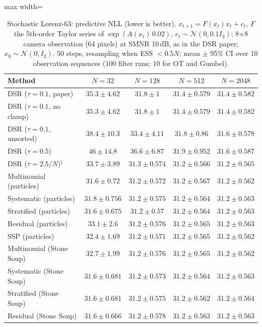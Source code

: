 \begin{table}[H]
\centering
\small
\caption{Stochastic Lorenz-63: predictive NLL (lower is better). $x_{t+1}=F(x_t)x_t+e_t$, $F$ the 5th-order Taylor series of $\exp(A(x_t)\,0.02)$, $e_t\sim\mathcal N(0,0.1I_3)$; 8$\times$8 camera observation (64 pixels) at SMNR 10\,dB, as in the DSR paper; $x_0\sim\mathcal N(0,I_3)$. 50 steps, resampling when ESS $<0.5N$; mean $\pm$ 95\% CI over 10 observation sequences (100 filter runs; 10 for OT and Gumbel).}
\label{tab:lorenz63-predictive_nll}
\begin{adjustbox}{max width=\linewidth}
\begin{tabular}{lcccc}
\toprule
Method & $N{=}32$ & $N{=}128$ & $N{=}512$ & $N{=}2048$ \\
\midrule
DSR ($\tau{=}0.1$, paper) & $35.3\pm4.62$ & $31.8\pm1$ & $31.4\pm0.579$ & $31.4\pm0.582$ \\
DSR ($\tau{=}0.1$, no clamp) & $35.3\pm4.62$ & $31.8\pm1$ & $31.4\pm0.579$ & $31.4\pm0.582$ \\
DSR ($\tau{=}0.1$, unsorted) & $38.4\pm10.3$ & $33.4\pm4.11$ & $31.8\pm0.86$ & $31.6\pm0.578$ \\
DSR ($\tau{=}0.5$) & $46\pm14.8$ & $36.6\pm6.87$ & $31.9\pm0.952$ & $31.6\pm0.587$ \\
DSR ($\tau{=}2.5/N$)$^\dagger$ & $33.7\pm3.89$ & $31.3\pm0.574$ & $31.2\pm0.566$ & $31.2\pm0.565$ \\
\midrule
Multinomial (particles) & $31.6\pm0.72$ & $31.2\pm0.572$ & $31.2\pm0.567$ & $31.2\pm0.562$ \\
Systematic (particles) & $31.8\pm0.756$ & $31.2\pm0.575$ & $31.2\pm0.564$ & $31.2\pm0.563$ \\
Stratified (particles) & $31.6\pm0.675$ & $31.2\pm0.57$ & $31.2\pm0.564$ & $31.2\pm0.563$ \\
Residual (particles) & $33.1\pm2.6$ & $31.2\pm0.576$ & $31.2\pm0.565$ & $31.2\pm0.563$ \\
SSP (particles) & $32.4\pm1.69$ & $31.2\pm0.571$ & $31.2\pm0.565$ & $31.2\pm0.562$ \\
Multinomial (Stone Soup) & $32.7\pm1.99$ & $31.2\pm0.576$ & $31.2\pm0.565$ & $31.2\pm0.562$ \\
Systematic (Stone Soup) & $31.6\pm0.681$ & $31.2\pm0.573$ & $31.2\pm0.564$ & $31.2\pm0.563$ \\
Stratified (Stone Soup) & $31.6\pm0.681$ & $31.2\pm0.575$ & $31.2\pm0.562$ & $31.2\pm0.564$ \\
Residual (Stone Soup) & $31.6\pm0.666$ & $31.2\pm0.578$ & $31.2\pm0.563$ & $31.2\pm0.563$ \\

\end{tabular}
\end{adjustbox}
\end{table}
